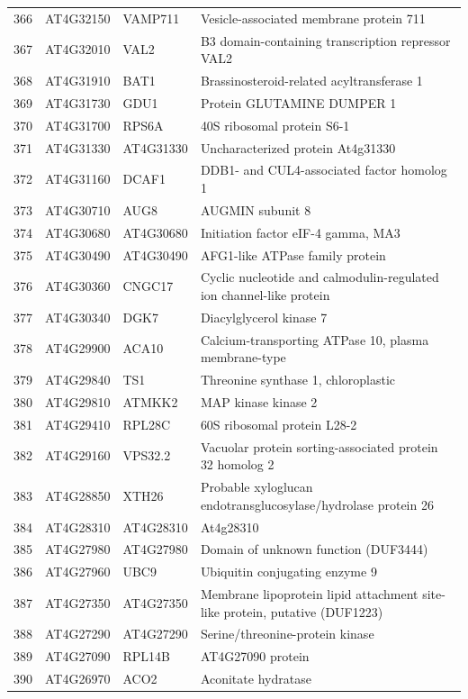 \documentclass[11pt]{article}
\begin{document}
\begin{center}
\begin{tabular}{rlll}
366 & AT4G32150 & VAMP711 & Vesicle-associated membrane protein 711\\
367 & AT4G32010 & VAL2 & B3 domain-containing transcription repressor VAL2\\
368 & AT4G31910 & BAT1 & Brassinosteroid-related acyltransferase 1\\
369 & AT4G31730 & GDU1 & Protein GLUTAMINE DUMPER 1\\
370 & AT4G31700 & RPS6A & 40S ribosomal protein S6-1\\
371 & AT4G31330 & AT4G31330 & Uncharacterized protein At4g31330\\
372 & AT4G31160 & DCAF1 & DDB1- and CUL4-associated factor homolog 1\\
373 & AT4G30710 & AUG8 & AUGMIN subunit 8\\
374 & AT4G30680 & AT4G30680 & Initiation factor eIF-4 gamma, MA3\\
375 & AT4G30490 & AT4G30490 & AFG1-like ATPase family protein\\
376 & AT4G30360 & CNGC17 & Cyclic nucleotide and calmodulin-regulated ion channel-like protein\\
377 & AT4G30340 & DGK7 & Diacylglycerol kinase 7\\
378 & AT4G29900 & ACA10 & Calcium-transporting ATPase 10, plasma membrane-type\\
379 & AT4G29840 & TS1 & Threonine synthase 1, chloroplastic\\
380 & AT4G29810 & ATMKK2 & MAP kinase kinase 2\\
381 & AT4G29410 & RPL28C & 60S ribosomal protein L28-2\\
382 & AT4G29160 & VPS32.2 & Vacuolar protein sorting-associated protein 32 homolog 2\\
383 & AT4G28850 & XTH26 & Probable xyloglucan endotransglucosylase/hydrolase protein 26\\
384 & AT4G28310 & AT4G28310 & At4g28310\\
385 & AT4G27980 & AT4G27980 & Domain of unknown function (DUF3444)\\
386 & AT4G27960 & UBC9 & Ubiquitin conjugating enzyme 9\\
387 & AT4G27350 & AT4G27350 & Membrane lipoprotein lipid attachment site-like protein, putative (DUF1223)\\
388 & AT4G27290 & AT4G27290 & Serine/threonine-protein kinase\\
389 & AT4G27090 & RPL14B & AT4G27090 protein\\
390 & AT4G26970 & ACO2 & Aconitate hydratase\\

\end{tabular}
\end{center}
\end{document}
